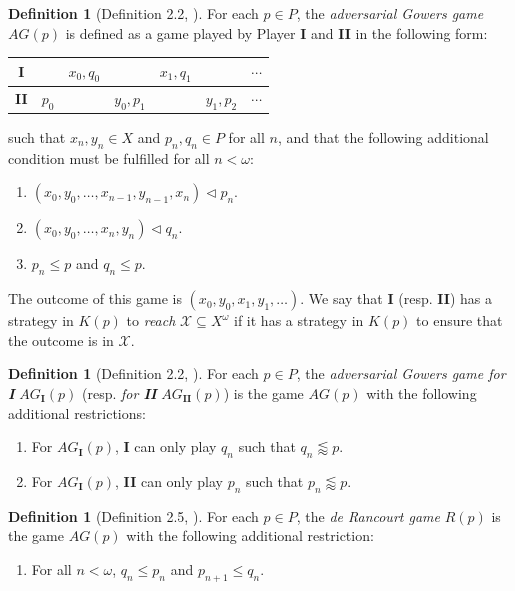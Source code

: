 \documentclass[11pt,reqno]{amsart}
\theoremstyle{plain}
\numberwithin{equation}{section}
\theoremstyle{definition}
\newtheorem{definition}[theorem]{Definition}
\newcommand{\cal}{\mathcal}
\newcommand{\X}{\cal{X}}
\begin{document}
\begin{definition}[Definition 2.2, \cite{d20}]
    For each $p \in P$, the \emph{adversarial Gowers game} $AG(p)$ is defined as a game played by Player \textbf{I} and \textbf{II} in the following form:
    \begin{center}
        \begin{tabular}{c|cccccc}
            \textbf{I} & & $x_0,q_0$ & & $x_1,q_1$ & & $\cdots$ \\
            \hline
            \textbf{II} & $p_0$ & & $y_0,p_1$ & & $y_1,p_2$ & $\cdots$ \\
        \end{tabular}
    \end{center}
    such that $x_n,y_n \in X$ and $p_n,q_n \in P$ for all $n$, and that the following additional condition must be fulfilled for all $n < \omega$:
    \begin{enumerate}
        \item $(x_0,y_0,\dots,x_{n-1},y_{n-1},x_n) \lhd p_n$.

        \item $(x_0,y_0,\dots,x_n,y_n) \lhd q_n$.

        \item $p_n \leq p$ and $q_n \leq p$.
    \end{enumerate}
    The outcome of this game is $(x_0,y_0,x_1,y_1,\dots)$. We say that \textbf{I} (resp. \textbf{II}) has a strategy in $K(p)$ to \emph{reach} $\X \subseteq X^\omega$ if it has a strategy in $K(p)$ to ensure that the outcome is in $\X$. 
\end{definition}

\begin{definition}[Definition 2.2, \cite{d20}]
    For each $p \in P$, the \emph{adversarial Gowers game for \textbf{I}} $AG_\textbf{I}(p)$ (resp. \emph{for \textbf{II}} $AG_\textbf{II}(p)$) is the game $AG(p)$ with the following additional restrictions:
    \begin{enumerate}
        \item For $AG_\textbf{I}(p)$, \textbf{I} can only play $q_n$ such that $q_n \lessapprox p$.

        \item For $AG_\textbf{I}(p)$, \textbf{II} can only play $p_n$ such that $p_n \lessapprox p$.
    \end{enumerate}
\end{definition}

\begin{definition}[Definition 2.5, \cite{d20}]
    For each $p \in P$, the \emph{de Rancourt game} $R(p)$ is the game $AG(p)$ with the following additional restriction:
    \begin{enumerate}
        \item For all $n < \omega$, $q_n \leq p_n$ and $p_{n+1} \leq q_n$.
    \end{enumerate}
\end{definition}
\end{document}
